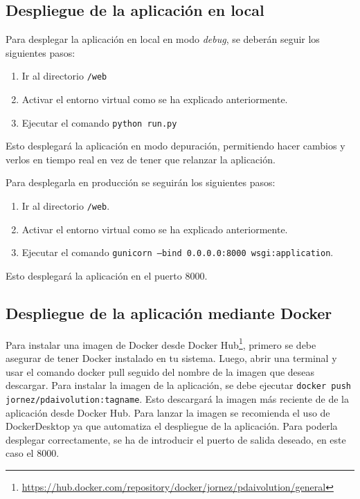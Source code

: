 \subsection{Despliegue de la aplicación en local}

Para desplegar la aplicación en local en modo \textit{debug}, se deberán seguir los siguientes pasos:

\begin{enumerate}
\item Ir al directorio \texttt{/web}
\item Activar el entorno virtual como se ha explicado anteriormente.
\item Ejecutar el comando \texttt{python run.py}
\end{enumerate}

Esto desplegará la aplicación en modo depuración, permitiendo hacer cambios y verlos en tiempo real en vez de tener que relanzar la aplicación.

Para desplegarla en producción se seguirán los siguientes pasos:
\begin{enumerate}
\item Ir al directorio \texttt{/web}.
\item Activar el entorno virtual como se ha explicado anteriormente.
\item Ejecutar el comando \texttt{gunicorn --bind 0.0.0.0:8000 wsgi:application}.
\end{enumerate}

Esto desplegará la aplicación en el puerto 8000.

\subsection{Despliegue de la aplicación mediante Docker}


Para instalar una imagen de Docker desde Docker Hub\footnote{\url{https://hub.docker.com/repository/docker/jornez/pdaivolution/general}}, primero se debe asegurar de tener Docker instalado en tu sistema. Luego, abrir una terminal y usar el comando docker pull seguido del nombre de la imagen que deseas descargar. Para instalar la imagen de la aplicación, se debe ejecutar \texttt{docker push jornez/pdaivolution:tagname}. Esto descargará la imagen más reciente de de la aplicación desde Docker Hub. Para lanzar la imagen se recomienda el uso de DockerDesktop ya que automatiza el despliegue de la aplicación. Para poderla desplegar correctamente, se ha de introducir el puerto de salida deseado, en este caso el 8000.


